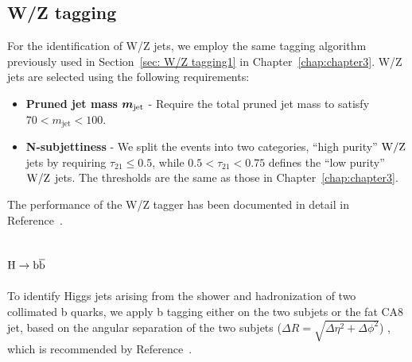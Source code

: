\subsection{W/Z tagging  } 
\label{sec:wztagging}

For the identification of W/Z jets, we employ the same tagging algorithm 
previously used in Section~\ref{sec: W/Z tagging1} in Chapter~\ref{chap:chapter3}.  W/Z jets are selected using the following requirements:
\begin{itemize}

\item {\bf Pruned jet mass}  $\mbox{\boldmath$m_{\text{jet}}$}$
  - Require the total pruned jet mass to satisfy $70 < m_\text{jet} <  100$\GeVcc.

\item {\bf N-subjettiness} 
  - We split the events into two categories, ``high purity'' ${\rm W}/{\rm Z}$ jets by
    requiring $\tau_{21} \leq 0.5$, while $ 0.5 < \tau_{21} < 0.75$ defines 
    the ``low purity'' ${\rm W}/{\rm Z}$ jets.  The thresholds are the same as those in 
    Chapter~\ref{chap:chapter3}. 
\end{itemize}
The performance of the W/Z tagger has been documented in detail in Reference~\cite{JME-13-006}.















\subsection{${\rm H\to\mathrm{b\overline{b}}}$ }
\label{sec:higgsTaggerbb}

To identify Higgs jets arising from the shower and hadronization of two 
collimated b quarks, we apply b tagging either on the two subjets or the
fat CA8 jet, based on the angular separation of the two subjets
($\Delta R = \sqrt{ \Delta \eta^2 + \Delta \phi^2 }$)
, which is 
recommended by Reference~\cite{BTV-13-001}. 


